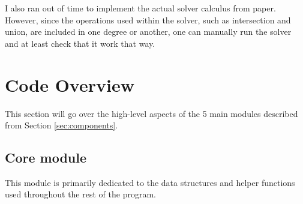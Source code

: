 \documentclass[letterpaper, 11pt]{article}
\begin{document}
I also ran out of time to implement the actual solver calculus from paper.
However, since the operations used within the solver, such as intersection and union, are included in one degree or another, one can manually run the solver and at least check that it work that way.

\section{Code Overview}\label{sec:code}
This section will go over the high-level aspects of the 5 main modules described from Section \ref*{sec:components}.
\subsection{Core module}\label{code:core}
This module is primarily dedicated to the data structures and helper functions used throughout the rest of the program.
\end{document}
